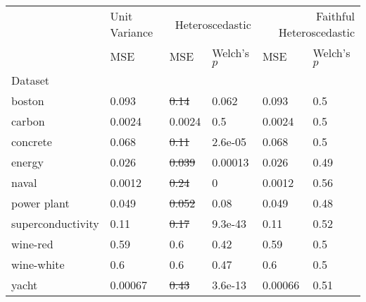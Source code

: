 \begin{tabular}{l|l|ll|ll}
\toprule
 & Unit Variance & \multicolumn{2}{r}{Heteroscedastic} & \multicolumn{2}{r}{Faithful Heteroscedastic} \\
 & MSE & MSE & Welch's $p$ & MSE & Welch's $p$ \\
Dataset &  &  &  &  &  \\
\midrule
boston & 0.093 & \sout{0.14} & 0.062 & 0.093 & 0.5 \\
carbon & 0.0024 & 0.0024 & 0.5 & 0.0024 & 0.5 \\
concrete & 0.068 & \sout{0.11} & 2.6e-05 & 0.068 & 0.5 \\
energy & 0.026 & \sout{0.039} & 0.00013 & 0.026 & 0.49 \\
naval & 0.0012 & \sout{0.24} & 0 & 0.0012 & 0.56 \\
power plant & 0.049 & \sout{0.052} & 0.08 & 0.049 & 0.48 \\
superconductivity & 0.11 & \sout{0.17} & 9.3e-43 & 0.11 & 0.52 \\
wine-red & 0.59 & 0.6 & 0.42 & 0.59 & 0.5 \\
wine-white & 0.6 & 0.6 & 0.47 & 0.6 & 0.5 \\
yacht & 0.00067 & \sout{0.43} & 3.6e-13 & 0.00066 & 0.51 \\
\bottomrule
\end{tabular}
